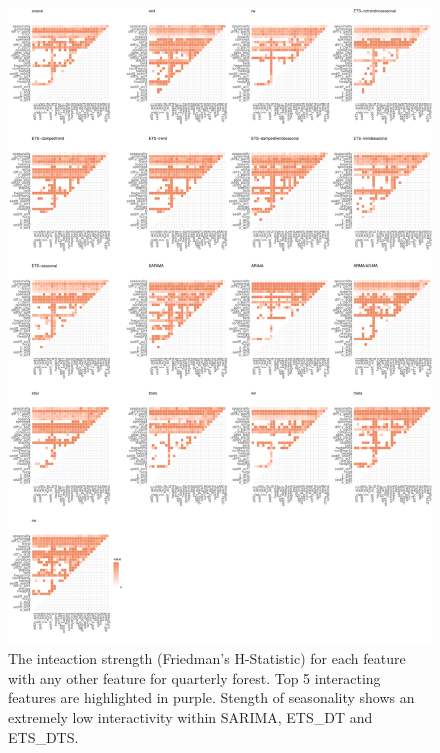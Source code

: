 \documentclass[11pt,a4paper,]{article}
\begin{document}
\begin{figure}
\centering
\includegraphics{figures/friedmanq-1.pdf}
\caption{\label{fig:friedmanq}The inteaction strength (Friedman's H-Statistic) for each feature with any other feature for quarterly forest. Top 5 interacting features are highlighted in purple. Stength of seasonality shows an extremely low interactivity within SARIMA, ETS\_DT and ETS\_DTS.}
\end{figure}
\end{document}
